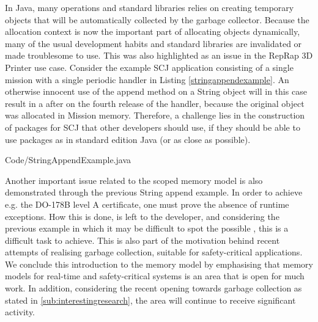 In Java, many operations and standard libraries relies on creating temporary objects that will be automatically collected by the garbage collector. Because the allocation context is now the important part of allocating objects dynamically, many of the usual development habits and standard libraries are invalidated or made troublesome to use. This was also highlighted as an issue in the RepRap 3D Printer use case\cite{Schoeberl:2012:RepRap}. Consider the example SCJ application consisting of a single mission with a single periodic handler in Listing \ref{stringappendexample}. An otherwise innocent use of the append method on a String object will in this case result in a  after on the fourth release of the handler, because the original  object was allocated in Mission memory. Therefore, a challenge lies in the construction of packages for SCJ that other developers should use, if they should be able to use packages as in standard edition Java (or as close as possible).

{Code/StringAppendExample.java}

Another important issue related to the scoped memory model is also demonstrated through the previous String append example. In order to achieve e.g. the DO-178B level A certificate, one must prove the absence of runtime exceptions\cite{Schoeberl:2007:GCS:1288940.1288953}. How this is done, is left to the developer, and considering the previous example in which it may be difficult to spot the possible , this is a difficult task to achieve. This is also part of the motivation behind recent attempts of realising garbage collection, suitable for safety-critical applications. We conclude this introduction to the memory model by emphasising that memory models for real-time and safety-critical systems is an area that is open for much work. In addition, considering the recent opening towards garbage collection as stated in \ref{sub:interestingresearch}, the area will continue to receive significant activity.